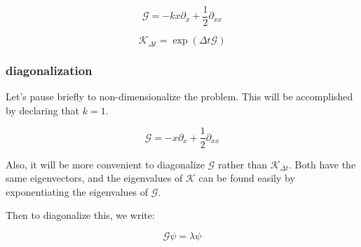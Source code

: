 \documentclass[]{article}
\newcommand{\p}[1]{\left( #1 \right)}
\newcommand{\II}{\mathbb{I}}
\newcommand{\Kp}{\mathcal{K}}
\begin{document}
$$
\mathcal{G} = -kx\partial_x + \frac{1}{2}\partial_{xx}
$$

$$
\Kp_{\Delta t} = \exp(\Delta t \mathcal{G})
$$

\subsubsection{diagonalization}

Let's pause briefly to non-dimensionalize the problem. This will be accomplished by declaring that $k=1$.

$$
\mathcal{G} = -x\partial_x + \frac{1}{2}\partial_{xx}
$$

Also, it will be more convenient to diagonalize $\mathcal{G}$ rather than $\Kp_{\Delta t}$. Both have the same eigenvectors, and the eigenvalues of $\Kp$ can be found easily by exponentiating the eigenvalues of $\mathcal{G}$.

Then to diagonalize this, we write:

$$
\mathcal{G} \psi = \lambda \psi
$$
\end{document}
